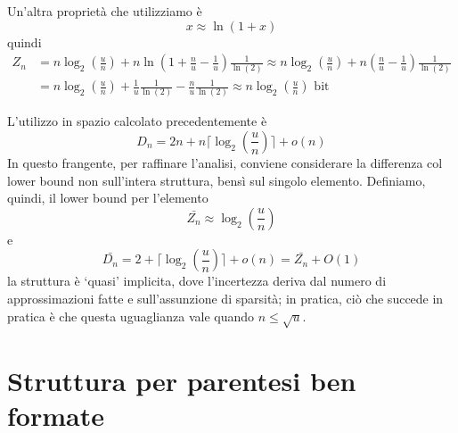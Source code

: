 \noindent
Un'altra proprietà che utilizziamo è
$$
	x \approx \ln(1 + x)
$$
quindi
\begin{align*}
	Z_n & = n \log_2(\frac{u}{n}) + n \ln(1 + \frac{n}{u}-\frac{1}{u})\frac{1}{\ln(2)}
	\approx n \log_2(\frac{u}{n}) + n (\frac{n}{u}-\frac{1}{u})\frac{1}{\ln(2)}               \\
	    & = n \log_2(\frac{u}{n}) + \frac{1}{u}\frac{1}{\ln(2)} - \frac{n}{u}\frac{1}{\ln(2)}
	\approx n \log_2(\frac{u}{n}) \text{ bit}
\end{align*}

L'utilizzo in spazio calcolato precedentemente è
$$
	D_n = 2n + n \lceil \log_2(\frac{u}{n}) \rceil + o(n)
$$
In questo frangente, per raffinare l'analisi, conviene considerare la differenza
col lower bound non sull'intera struttura, bensì sul singolo elemento.
Definiamo, quindi, il lower bound per l'elemento
$$
	\bar{Z_n} \approx \log_2(\frac{u}{n})
$$
e
$$
	\bar{D_n} = 2+ \lceil \log_2(\frac{u}{n}) \rceil + o(n) = \bar{Z_n} + O(1)
$$
la struttura è `quasi' implicita, dove l'incertezza deriva dal numero di
approssimazioni fatte e sull'assunzione di sparsità; in pratica, ciò che succede
in pratica è che questa uguaglianza vale quando $n \leq \sqrt{u}$.

\section{Struttura per parentesi ben formate}

